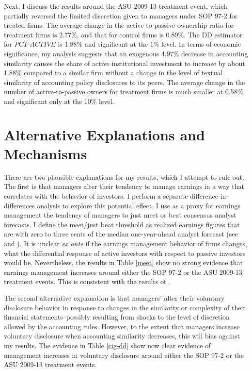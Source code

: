 \documentclass[thesis]{thesis-umich}
\begin{document}
Next, I discuss the results around the ASU 2009-13 treatment event, which partially reversed the limited discretion given to managers under SOP 97-2 for treated firms. The average change in the active-to-passive ownership ratio for treatment firms is 2.77\%, and that for control firms is 0.89\%. The DD estimator for $PCT\text{-}ACTIVE$ is 1.88\% and significant at the 1\% level. In terms of economic significance, my analysis suggests that an exogenous 4.97\% decrease in accounting similarity causes the share of active institutional investment to increase by about 1.88\%  compared to a similar firm without a change in the level of textual similarity of accounting policy disclosures to its peers. The average change in the number of active-to-passive owners for treatment firms is much smaller at 0.58\% and significant only at the 10\% level.

\section{Alternative Explanations and Mechanisms}\label{sec:robust}
There are two plausible explanations for my results, which I attempt to rule out. The first is that managers alter their tendency to manage earnings in a way that correlates with the behavior of investors. I perform a separate difference-in-differences analysis to explore this potential effect. I use as a proxy for earnings management the tendency of managers to just meet or beat consensus analyst forecasts. I define the meet/just beat threshold as realized earnings figures that are with zero to three cents of the median one-year-ahead analyst forecast (see \cite{beattyetal2002} and \cite{ayersetal2006}). It is unclear \emph{ex ante} if the earnings management behavior of firms changes, what the differential response of active investors with respect to passive investors would be. Nevertheless, the results in Table \ref{meet} show no strong evidence that earnings management increases around either the SOP 97-2 or the ASU 2009-13 treatment events. This is consistent with the results of \cite{srivastava2014}.

The second alternative explanation is that managers' alter their voluntary disclosure behavior in response to changes in the similarity or complexity of their financial statements--possibly resulting from shocks to the level of discretion allowed by the accounting rules. However, to the extent that managers increase voluntary disclosure when accounting similarity decreases, this will bias against my results. The evidence in Table \ref{cig-dd} show now clear evidence of management increases in voluntary disclosure around either the SOP 97-2 or the ASU 2009-13 treatment events.
\end{document}
